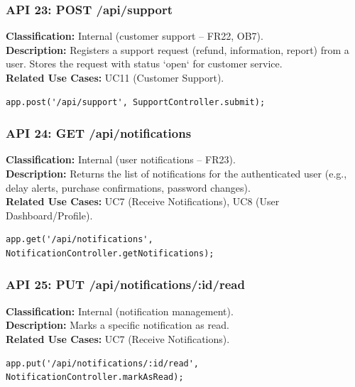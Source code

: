 \documentclass{article}
\begin{document}
\subsubsection*{API 23: POST /api/support}
\textbf{Classification:} Internal (customer support – FR22, OB7).\\
\textbf{Description:} Registers a support request (refund, information, report)
from a user. Stores the request with status `open` for customer service.\\
\textbf{Related Use Cases:} UC11 (Customer Support).
\begin{verbatim}
app.post('/api/support', SupportController.submit);
\end{verbatim}

\subsubsection*{API 24: GET /api/notifications}
\textbf{Classification:} Internal (user notifications – FR23).\\
\textbf{Description:} Returns the list of notifications for the authenticated user
(e.g., delay alerts, purchase confirmations, password changes).\\
\textbf{Related Use Cases:} UC7 (Receive Notifications), UC8 (User Dashboard/Profile).
\begin{verbatim}
app.get('/api/notifications', NotificationController.getNotifications);
\end{verbatim}

\subsubsection*{API 25: PUT /api/notifications/:id/read}
\textbf{Classification:} Internal (notification management).\\
\textbf{Description:} Marks a specific notification as read.\\
\textbf{Related Use Cases:} UC7 (Receive Notifications).
\begin{verbatim}
app.put('/api/notifications/:id/read', NotificationController.markAsRead);
\end{verbatim}

\end{document}
